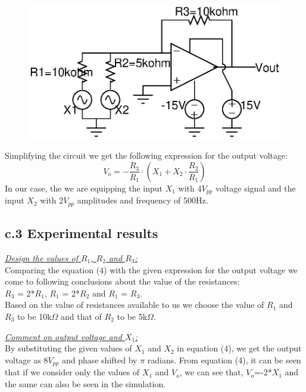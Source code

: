 \documentclass[12pt]{article}
\begin{document}
 \begin{figure}[h!]
\centering
\includegraphics[scale = 1]{Exp_1_c.eps}
\end{figure}

 Simplifying the circuit we get the following expression for the output voltage:
 \begin{equation}
     V_{o} = - \frac{R_{3}}{R_{1}} \cdot (X_{1} + X_{2} \cdot \frac{R_{2}}{R_{1}} )
 \end{equation}
 In our case, the we are equipping the input $X_{1}$ with 4$V_{pp}$ voltage signal and the input $X_{2}$ with 2$V_{pp}$ amplitudes and frequency of 500Hz. 


\subsection* {c.3 Experimental results}
\underline{\textit{Design the values of $R_{1}$, $R_{2}$ and $R_{3}$:}}\\
Comparing the equation (4) with the given expression for the output voltage we come to following conclusions about the value of the resistances:\\
$R_{3}$ = 2*$R_{1}$, $R_{1}$ = 2*$R_{2}$ and $R_{1}$ = $R_{3}$. \\
Based on the value of resistances available to us we choose the value of $R_{1}$ and $R_{3}$ to be 10k$\Omega$ and that of $R_{2}$ to be 5k$\Omega$.


\!\!\!\!\!\!\!\!\!\underline{\textit{Comment on output voltage and $X_{1}$:}}\\
By substituting the given values of $X_{1}$ and $X_{2}$ in equation (4), we get the output voltage as 8$V_{pp}$ and phase shifted by $\pi$ radians. From equation (4), it can be seen that if we consider only the values of $X_{1}$ and $V_{o}$, we can see that, $V_{o}$=-2*$X_{1}$ and the same can also be seen in the simulation.
\newpage
\end{document}
